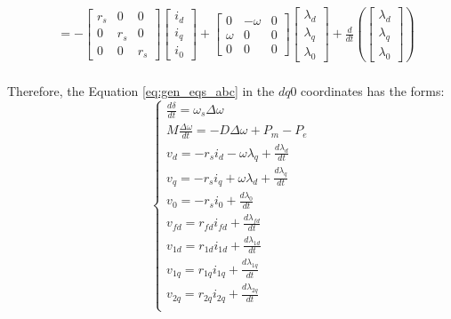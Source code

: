 \begin{equation*}
\begin{aligned}
        &= -
        \begin{bmatrix}
            r_s & 0 & 0\\
            0 & r_s & 0\\
            0 & 0 & r_s
        \end{bmatrix}
        \begin{bmatrix}
            i_d \\ i_q \\ i_0
        \end{bmatrix}
        +
        \begin{bmatrix}
            0 & -\omega & 0 \\
            \omega & 0 & 0 \\
            0 & 0 & 0
        \end{bmatrix}\begin{bmatrix}\lambda_d \\ \lambda_q\\ \lambda_0\end{bmatrix}
        +
        \frac{d}{dt} \left(\begin{bmatrix}\lambda_d \\ \lambda_q\\ \lambda_0\end{bmatrix}\right) \\ 
    \end{aligned}
\end{equation*}

Therefore, the Equation \ref{eq:gen_eqs_abc} in the $dq0$ coordinates has the forms:
\begin{equation}
    \begin{cases}
        \frac{d\delta}{dt} = \omega_s \Delta\omega\\
        M\frac{\Delta\omega}{dt} = -D\Delta\omega + P_m - P_e\\
        v_d = -r_s i_d - \omega\lambda_q + \frac{d\lambda_d}{dt}\\
        v_q = -r_s i_q + \omega\lambda_d + \frac{d\lambda_q}{dt}\\
        v_0 = -r_s i_0 + \frac{d\lambda_0}{dt}\\
        v_{fd} = r_{fd} i_{fd} + \frac{d\lambda_{fd}}{dt}\\
        v_{1d} = r_{1d} i_{1d} + \frac{d\lambda_{1d}}{dt}\\
        v_{1q} = r_{1q} i_{1q} + \frac{d\lambda_{1q}}{dt}\\
        v_{2q} = r_{2q} i_{2q} + \frac{d\lambda_{2q}}{dt}\\
    \end{cases}
    \label{eq:gen_eqs_dq0}
\end{equation}

